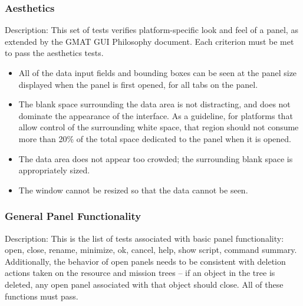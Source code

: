 \subsubsection{Aesthetics}

Description:  This set of tests verifies platform-specific look and feel of a panel, as extended
by the GMAT GUI Philosophy document\cite{Dove}. Each criterion must be met to pass the aesthetics
tests.

\begin{itemize}
\item All of the data input fields and bounding boxes can be seen at the panel size displayed when
the panel is first opened, for all tabs on the panel.
\item The blank space surrounding the data area is not distracting, and does not dominate the
appearance of the interface.  As a guideline, for platforms that allow control of the surrounding
white space, that region should not consume more than 20\% of the total space dedicated to the
panel when it is opened.
\item The data area does not appear too crowded; the surrounding blank space is appropriately sized.
\item The window cannot be resized so that the data cannot be seen.
\end{itemize}

\subsubsection{General Panel Functionality}

Description:  This is the list of tests associated with basic panel functionality: open, close,
rename, minimize, ok, cancel, help, show script, command summary.  Additionally, the behavior of
open panels needs to be consistent with deletion actions taken on the resource and mission trees 
-- if an object in the tree is deleted, any open panel associated with that object should close.
All of these functions must pass.

